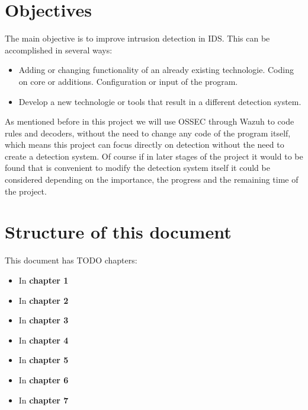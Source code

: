




\section{Objectives}
The main objective is to improve intrusion detection in IDS. This can be accomplished in several ways:
\begin{itemize}
	\item Adding or changing functionality of an already existing technologie.
		\subitem Coding on core or additions.
		\subitem Configuration or input of the program.
	\item Develop a new technologie or tools that result in a different detection system.
\end{itemize}

\linej
As mentioned before in this project we will use OSSEC through Wazuh to code rules and decoders, without the need to change any code of the program itself, which means this project can focus directly on detection without the need to create a detection system. Of course if in later stages of the project it would to be found that is convenient to modify the detection system itself it could be considered depending on the importance, the progress and the remaining time of the project.


\section{Structure of this document}
This document has TODO chapters:
\begin{itemize}
	\item In \textbf{chapter 1} 
	\item In \textbf{chapter 2} 
	\item In \textbf{chapter 3} 
	\item In \textbf{chapter 4} 
	\item In \textbf{chapter 5} 
	\item In \textbf{chapter 6} 
	\item In \textbf{chapter 7} 
\end{itemize}
